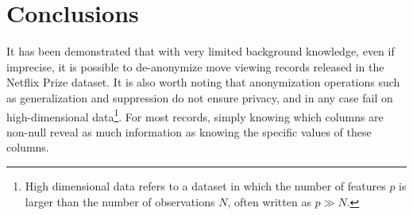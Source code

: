 \documentclass[conference]{IEEEtran}
\begin{document}
\section{Conclusions}

It has been demonstrated that with very limited background knowledge, even if imprecise, it is 
possible to de-anonymize move viewing records released in the Netflix Prize dataset. It is also 
worth noting that anonymization operations such as generalization and suppression do not ensure 
privacy, and in any case fail on high-dimensional data\footnote{High dimensional data refers to a 
dataset in which the number of features $p$ is larger than the number of observations $N$, often 
written as $p \gg N$.}. For most records, simply knowing which columns are non-null reveal as much 
information as knowing the specific values of these columns. 



\end{document}
